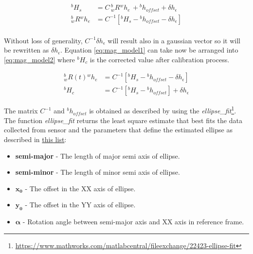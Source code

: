 \begin{equation}
\begin{aligned}
{}^bH_{s}&=C\,{}^b_wR{}^wh_e\, + {}^bh_{offset} + \delta h_{\epsilon}\\
{}^b_wR{}^wh_e &=C^{-1}[{}^bH_{s}-{}^bh_{offset} - \delta h_{\epsilon}] \\
\end{aligned}
\label{eq:mag_model1}
\end{equation}

Without loss of generality, $C^{-1}\delta h_{\epsilon}$ will result
also in a gaussian vector so it will be rewritten as $\delta
h_{\epsilon}$. Equation \eqref{eq:mag_model1} can take now be arranged into \eqref{eq:mag_model2} where ${}^bH_{c}$ is the corrected value
after calibration process.

\begin{equation}
\begin{aligned}
{}^b_wR(t){}^wh_e &=C^{-1}[{}^bH_{s}-{}^bh_{offset} - \delta h_{\epsilon}] \\
{}^bH_{c} &= C^{-1}[{}^bH_{s}-{}^bh_{offset}] + \delta h_{\epsilon}
\end{aligned}
\label{eq:mag_model2}
\end{equation}

The matrix $C^{-1}$ and ${}^bh_{offset}$ is obtained as described by
\cite{Caruso2000} using the
\textit{ellipse\_fit}\footnote{\href{https://www.mathworks.com/matlabcentral/fileexchange/22423-ellipse-fit}{https://www.mathworks.com/matlabcentral/fileexchange/22423-ellipse-fit}}. The function \textit{ellipse\_fit} returns the least square estimate that best fits the data collected from sensor and the parameters that define the estimated ellipse as described in \hyperref[list:ellipsfit_out]{this list}:

\begin{itemize}[noitemsep]
	\label{list:ellipsfit_out}  
	\item \textbf{semi-major} - The length of major semi axis of ellipse. 
	\item \textbf{semi-minor} - The length of minor semi axis of ellipse. 
	\item $\bm{x_0}$ - The offset in the XX axis of ellipse.
	\item $\bm{y_0}$ - The offset in the YY axis of ellipse.
	\item $\bm{\alpha}$ - Rotation angle between semi-major axis and XX axis in reference frame.
\end{itemize}

